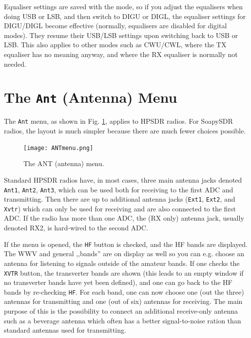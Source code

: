 \documentclass[12pt]{book}
\def\rett#1{\texttt{\color{red}#1}}
\def\bltt#1{\texttt{\color{blue}#1}}
\begin{document}
Equaliser settings are saved with the mode, so
if you adjust the equalisers when doing USB or LSB, and then switch to
DIGU or DIGL, the equaliser settings for DIGU/DIGL become effective
(normally, equalisers are disabled for digital modes).
They resume their USB/LSB
settings upon switching back to USB or LSB. This also applies to other
modes such as CWU/CWL, where the TX equaliser has no meaning
anyway, and where the RX equaliser is normally not needed.

\section{The \texttt{Ant} (Antenna) Menu}

The \bltt{Ant} menu, as shown in Fig. \ref{fig:ANTmenu},
applies to HPSDR radios. For SoapySDR radios, the layout
is much simpler because there are much fewer choices possible.

\begin{figure}[ht]
\center
\texttt{[image: ANTmenu.png]}
\caption{The ANT (antenna) menu.}
\label{fig:ANTmenu}
\end{figure}

Standard HPSDR radios have, in most cases, three main antenna jacks
denoted \rett{Ant1}, \rett{Ant2}, \rett{Ant3}, which can be used both for receiving to
the first ADC and
transmitting. Then there are up to additional antenna jacks (\rett{Ext1}, \rett{Ext2},
and \rett{Xvtr}) which can only be used for receiving and are also connected
to the first ADC. If the radio has more than one ADC, the (RX only)
antenna jack, usually denoted RX2, is hard-wired to the second ADC.

If the menu is opened, the \rett{HF} button is checked, and the HF bands
are displayed. The WWV and general ,,bands'' are on display as well so you
can e.g. choose an antenna for listening to signals outside of
the amateur bands.
If one checks the \rett{XVTR} button, the transverter bands
are shown (this leads to an empty window if no transverter bands have
yet been defined), and one can go back to the HF bands by re-checking
\rett{HF}.
For each band, one can now choose one (out the three) antennas for
transmitting and one (out of six) antennas for receiving. The main purpose
of this is the possibility to connect an additional receive-only antenna
such as a beverage antenna which often has a better signal-to-noise
ration than standard antennas used for transmitting.
\end{document}
